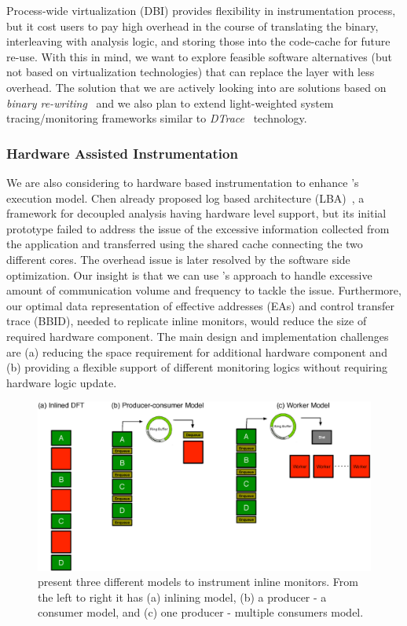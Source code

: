 Process-wide virtualization (\ie DBI) provides flexibility in instrumentation
process, but it cost users to pay high overhead in the course of translating
the binary, interleaving with analysis logic, and storing those into the code-cache
for future re-use. With this in mind, we want to explore feasible
software alternatives (but not based on virtualization technologies)
that can replace the layer with less overhead. The solution that we are actively
looking into are solutions based on {\it binary re-writing}~\cite{cfi,
brewriting:usenix2003} and we also plan to extend light-weighted system
tracing/monitoring frameworks similar to {\it DTrace}~\cite{DTrace} technology.

\subsubsection{Hardware Assisted Instrumentation} 
\label{ssec:hw_inst}

We are also considering to hardware based instrumentation to enhance
\sreplica's execution model. Chen \etal already proposed log based architecture
(LBA)~\cite{lba:isca2008}, a framework for decoupled analysis having hardware
level support, but its initial prototype failed to address the issue of the
excessive information collected from the application and transferred using the
shared cache connecting the two different cores. The overhead issue is later
resolved by the software side optimization. 
%
Our insight is that we can use \sreplica's approach to handle excessive amount
of communication volume and frequency to tackle the issue. Furthermore, our
optimal data representation of effective addresses (EAs) and control transfer
trace (BBID), needed to replicate inline monitors, would reduce the size of
required hardware component.
%
The main design and implementation challenges are (a) reducing the space
requirement for additional hardware component and (b) providing a flexible
support of different monitoring logics without requiring hardware logic update.

\begin{figure}[tb]
    \centering
    \includegraphics[width=0.90\linewidth]{figs/model0.eps}

    \caption{present three different models to instrument inline monitors. From
    the left to right it has (a) inlining model, (b) a producer - a consumer
    model, and (c) one producer - multiple consumers model.\label{fig:model0}}

\end{figure}

